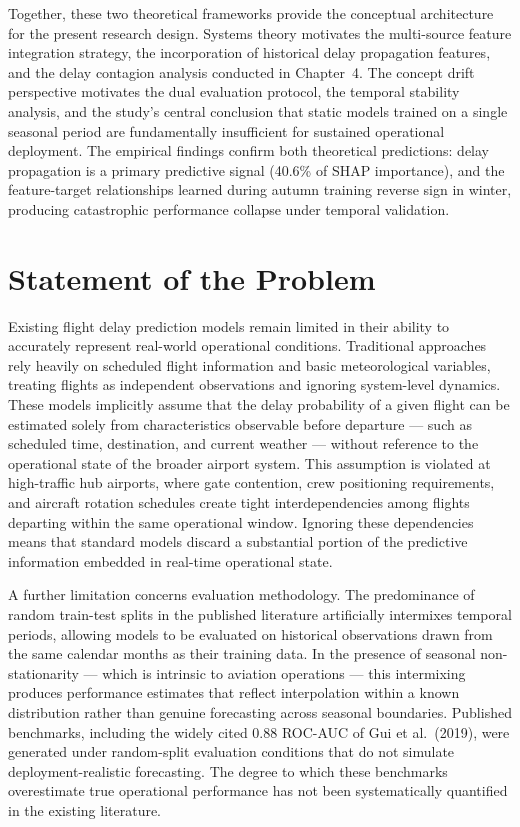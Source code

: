 \documentclass{report}
\begin{document}
Together, these two theoretical frameworks provide the conceptual architecture for 
the present research design. Systems theory motivates the multi-source feature 
integration strategy, the incorporation of historical delay propagation features, and 
the delay contagion analysis conducted in Chapter~4. The concept drift perspective 
motivates the dual evaluation protocol, the temporal stability analysis, and the 
study's central conclusion that static models trained on a single seasonal period are 
fundamentally insufficient for sustained operational deployment. The empirical findings 
confirm both theoretical predictions: delay propagation is a primary predictive signal 
(40.6\% of SHAP importance), and the feature-target relationships learned during 
autumn training reverse sign in winter, producing catastrophic performance collapse 
under temporal validation.

\section{Statement of the Problem}

Existing flight delay prediction models remain limited in their ability to 
accurately represent real-world operational conditions. Traditional approaches 
rely heavily on scheduled flight information and basic meteorological variables, 
treating flights as independent observations and ignoring system-level dynamics. 
These models implicitly assume that the delay probability of a given flight can 
be estimated solely from characteristics observable before departure --- such as 
scheduled time, destination, and current weather --- without reference to the 
operational state of the broader airport system. This assumption is violated at 
high-traffic hub airports, where gate contention, crew positioning requirements, 
and aircraft rotation schedules create tight interdependencies among flights 
departing within the same operational window. Ignoring these dependencies means 
that standard models discard a substantial portion of the predictive information 
embedded in real-time operational state.

A further limitation concerns evaluation methodology. The predominance of random 
train-test splits in the published literature artificially intermixes temporal 
periods, allowing models to be evaluated on historical observations drawn from 
the same calendar months as their training data. In the presence of seasonal 
non-stationarity --- which is intrinsic to aviation operations --- this intermixing 
produces performance estimates that reflect interpolation within a known distribution 
rather than genuine forecasting across seasonal boundaries. Published benchmarks, 
including the widely cited 0.88 ROC-AUC of Gui et al.\ (2019), were generated under 
random-split evaluation conditions that do not simulate deployment-realistic 
forecasting. The degree to which these benchmarks overestimate true operational 
performance has not been systematically quantified in the existing literature.
\end{document}
